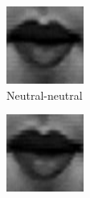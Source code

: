 \begin{figure}
\begin{subfigure}[b]{0.15\textwidth}
		\includegraphics[width=\textwidth]{./img/timeseriesHappy/S026_006_00000002_conew1.png}
		\caption{Neutral-neutral}
		\label{fig:timeseriesHappy:b}
	\end{subfigure}
	\begin{subfigure}[b]{0.15\textwidth}
		\includegraphics[width=\textwidth]{./img/timeseriesHappy/S026_006_00000003_conew1.png}

\end{subfigure}
\end{figure}
